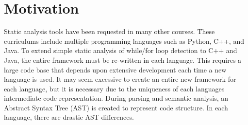 \documentclass[thesis]{hmcposter}
\begin{document}
\begin{poster}
\begin{figure}
\begin{center}
\hspace{0.3in}
\end{center}
\end{figure}



\section{Motivation}
Static analysis tools have been requested in many other courses. These curriculums include multiple programming languages such as Python, C++, and Java. To extend simple static analysis of while/for loop detection to C++ and Java, the entire framework must be re-written in each language. This requires a large code base that depends upon extensive development each time a new language is used. It may seem excessive to create an entire new framework for each language, but it is necessary due to the uniqueness of each languages intermediate code representation. During parsing and semantic analysis, an Abstract Syntax Tree (AST) is created to represent code structure. In each language, there are drastic AST differences. 


\end{poster}
\end{document}
